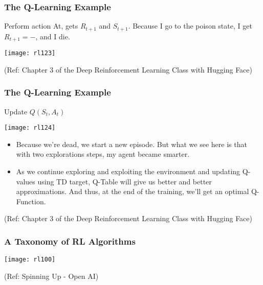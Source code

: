\begin{frame}[fragile]\frametitle{The Q-Learning Example}

 Perform action At, gets $R_{t+1}$ and $S_{t+1}$. Because I go to the poison state, I get $R_{t+1} = -$, and I die.
 
\begin{center}
\texttt{[image: rl123]}

\end{center}


{\tiny (Ref: Chapter 3 of the Deep Reinforcement Learning Class with Hugging Face)}

\end{frame}

\begin{frame}[fragile]\frametitle{The Q-Learning Example}

Update $Q(S_t, A_t)$

\begin{center}
\texttt{[image: rl124]}

\end{center}

\begin{itemize}
\item Because we're dead, we start a new episode. But what we see here is that with two explorations steps, my agent became smarter.
\item As we continue exploring and exploiting the environment and updating Q-values using TD target, Q-Table will give us better and better approximations. And thus, at the end of the training, we'll get an optimal Q-Function.
\end{itemize}



{\tiny (Ref: Chapter 3 of the Deep Reinforcement Learning Class with Hugging Face)}

\end{frame}



\begin{frame}[fragile]\frametitle{A Taxonomy of RL Algorithms}

\begin{center}
\texttt{[image: rl100]}
\end{center}

{\tiny (Ref: Spinning Up - Open AI)}
\end{frame}

